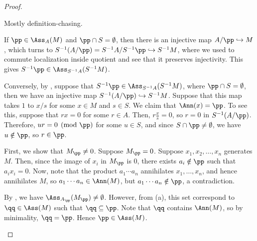 \begin{proof}
    \begin{alphenum}
    \item Mostly definition-chasing.
    
    If $\pp\in\Ass_A(M)$ and $\pp\cap S = \emptyset$,
    then there is an injective map $A/\pp \hookrightarrow M$,
    which turns to $S^{-1}(A/\pp) = S^{-1}A/S^{-1}\pp 
    \hookrightarrow S^{-1}M$,
    where we used 
    to commute localization inside quotient and 
    see that it preserves injectivity.
    This gives $S^{-1}\pp \in \Ass_{S^{-1}A}(S^{-1}M)$.

    Conversely, by ,
    suppose that $S^{-1}\pp \in \Ass_{S^{-1}A}(S^{-1}M)$,
    where $\pp\cap S=\emptyset$,
    then we have an injective map 
    $S^{-1}(A/\pp) \hookrightarrow S^{-1}M$.
    Suppose that this map takes $1$ to $x/s$ for some $x\in M$
    and $s\in S$. 
    We claim that $\Ann(x) = \pp$.
    To see this, suppose that $rx=0$ for some $r\in A$.
    Then, $r\tfrac xs = 0$, so $r=0$ in $S^{-1}(A/\pp)$.
    Therefore, $ur = 0\pmod\pp$ for some $u\in S$,
    and since $S\cap\pp\neq\emptyset$,
    we have $u\notin\pp$, so $r\in\pp$.

    \item First, we show that $M_\pp\neq 0$.
    Suppose $M_\pp=0$. Suppose $x_1,x_2,\dots,x_n$ generates $M$.
    Then, since the image of $x_i$ in $M_\pp$ is $0$,
    there exists $a_i\notin\pp$ such that $a_ix_i=0$.
    Now, note that the product $a_1\cdots a_n$ annihilates $x_1,\dots,x_n$,
    and hence annihilates $M$, so $a_1\cdots a_n \in \Ann(M)$,
    but $a_1\cdots a_n\notin\pp$, a contradiction.
    
    By , we have 
    $\Ass_{A_\pp}(M_\pp) \neq \emptyset$.
    However, from (a), this set correspond to $\qq\in \Ass(M)$
    such that $\qq\subseteq\pp$. Note that $\qq$ contains $\Ann(M)$,
    so by minimality, $\qq=\pp$. Hence $\pp\in\Ass(M)$.
    \qedhere
    \end{alphenum}
\end{proof}
%
%
%
%
